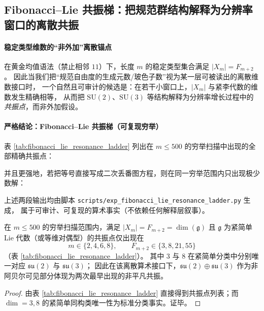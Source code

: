 \subsection{Fibonacci--Lie 共振梯：把规范群结构解释为分辨率窗口的离散共振}\label{subsec:fib-lie-resonance}

\paragraph{稳定类型维数的“非外加”离散锚点}
在黄金均值语法（禁止相邻 \(11\)）下，长度 \(m\) 的稳定类型集合满足
\(
|X_m|=F_{m+2}
\)。
因此当我们把“规范自由度的生成元数/玻色子数”视为某一层可被读出的离散维数接口时，
一个自然且可审计的候选是：在若干小窗口上，\(|X_m|\) 与紧李代数的维数发生精确相等，
从而把 \(\mathrm{SU}(2)\)、\(\mathrm{SU}(3)\) 等结构解释为分辨率增长过程中的\emph{共振点}，而非外加假设。

\paragraph{严格结论：Fibonacci--Lie 共振梯（可复现穷举）}
表 \ref{tab:fibonacci_lie_resonance_ladder} 列出在 \(m\le 500\) 的穷举扫描中出现的全部精确共振点：

并且更强地，若把等号直接写成二次丢番图方程，则在同一穷举范围内只出现极少数解：

上述两段输出均由脚本 \texttt{scripts/exp\_fibonacci\_lie\_resonance\_ladder.py} 生成，
属于可审计、可复现的算术事实（不依赖任何解释层叙事）。

\begin{corollary}\label{cor:fib-lie-resonance-scarcity-su2-su3}
在 \(m\le 500\) 的穷举扫描范围内，满足
\(
|X_m|=F_{m+2}=\dim(\mathfrak g)
\)
且 \(\mathfrak g\) 为紧简单 Lie 代数（或等维对偶型）的共振点仅出现在
\[
m\in\{2,4,6,8\},
\qquad
F_{m+2}\in\{3,8,21,55\}
\]
（表 \ref{tab:fibonacci_lie_resonance_ladder}）。
其中 \(3\) 与 \(8\) 在紧简单分类中分别唯一对应 \(\mathfrak{su}(2)\) 与 \(\mathfrak{su}(3)\)；
因此在该离散算术接口下，\(\mathfrak{su}(2)\oplus\mathfrak{su}(3)\) 作为非阿贝尔可见部分体现为两次最早出现的非平凡共振。
\end{corollary}
\begin{proof}
由表 \ref{tab:fibonacci_lie_resonance_ladder} 直接得到共振点列表；而 \(\dim=3,8\) 的紧简单同构类唯一性为标准分类事实。证毕。
\end{proof}

